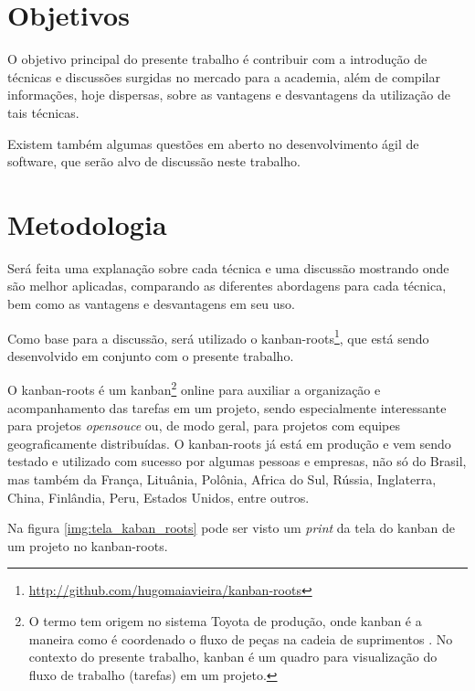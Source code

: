 \section{Objetivos}

O objetivo principal do presente trabalho é contribuir com a introdução de técnicas e discussões surgidas no mercado para a academia, além de compilar informações, hoje dispersas, sobre as vantagens e desvantagens da utilização de tais técnicas.

Existem também algumas questões em aberto no desenvolvimento ágil de software, que serão alvo de discussão neste trabalho.

\section{Metodologia}

Será feita uma explanação sobre cada técnica e uma discussão mostrando onde são melhor aplicadas, comparando as diferentes abordagens para cada técnica, bem como as vantagens e desvantagens em seu uso.

Como base para a discussão, será utilizado o kanban-roots\footnote{\url{http://github.com/hugomaiavieira/kanban-roots}}, que está sendo desenvolvido em conjunto com o presente trabalho.

O kanban-roots é um kanban\footnote{O termo tem origem no sistema Toyota de produção, onde kanban é a maneira como é coordenado o fluxo de peças na cadeia de suprimentos  \cite{AMaquinaQueMudouOMundo}. No contexto do presente trabalho, kanban é um quadro para visualização do fluxo de trabalho (tarefas) em um projeto.} online para auxiliar a organização e acompanhamento das tarefas em um projeto, sendo especialmente interessante para projetos \textit{opensouce} ou, de modo geral, para projetos com equipes geograficamente distribuídas.  O kanban-roots já está em produção e vem sendo testado e utilizado com sucesso por algumas pessoas e empresas, não só do Brasil, mas também da França, Lituânia, Polônia, Africa do Sul, Rússia, Inglaterra, China, Finlândia, Peru, Estados Unidos, entre outros.

Na figura \ref{img:tela_kaban_roots} pode ser visto um \textit{print} da tela do kanban de um projeto no kanban-roots.


